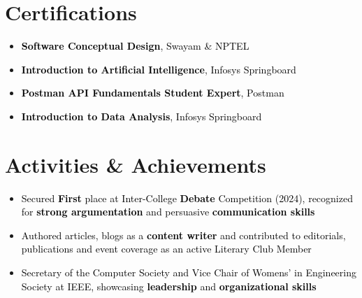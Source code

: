 \documentclass[a4paper,20pt]{article}
\begin{document}

\section{Certifications}
\vspace{5pt}
\begin{itemize}[label=\textbullet, labelsep=0.5em, left=0.5em, itemsep=-0.2em]
  \item \textcolor{black}{\textbf{Software Conceptual Design}, Swayam \& NPTEL}
  \item \textcolor{black}{\textbf{Introduction to Artificial Intelligence}, Infosys Springboard}
  \item \textcolor{black}{\textbf{Postman API Fundamentals Student Expert}, Postman}
  \item \textcolor{black}{\textbf{Introduction to Data Analysis}, Infosys Springboard}
\end{itemize}
\vspace{4pt}



\section{Activities \& Achievements}
\vspace{5pt}
\begin{itemize}[label=\textbullet, labelsep=0.5em, left=0.5em, itemsep=-0.2em]
  \item \textcolor{black}{Secured \textbf{First} place at Inter-College \textbf{Debate} Competition (2024), recognized for \textbf{strong argumentation} and persuasive \textbf{communication skills}}
  \item \textcolor{black}{Authored articles, blogs as a \textbf{content writer} and contributed to editorials, publications and event coverage as an active Literary Club Member}
  \item \textcolor{black}{Secretary of the Computer Society and Vice Chair of Womens' in Engineering Society at IEEE, showcasing \textbf{leadership} and \textbf{organizational skills}}
\end{itemize}
\end{document}
